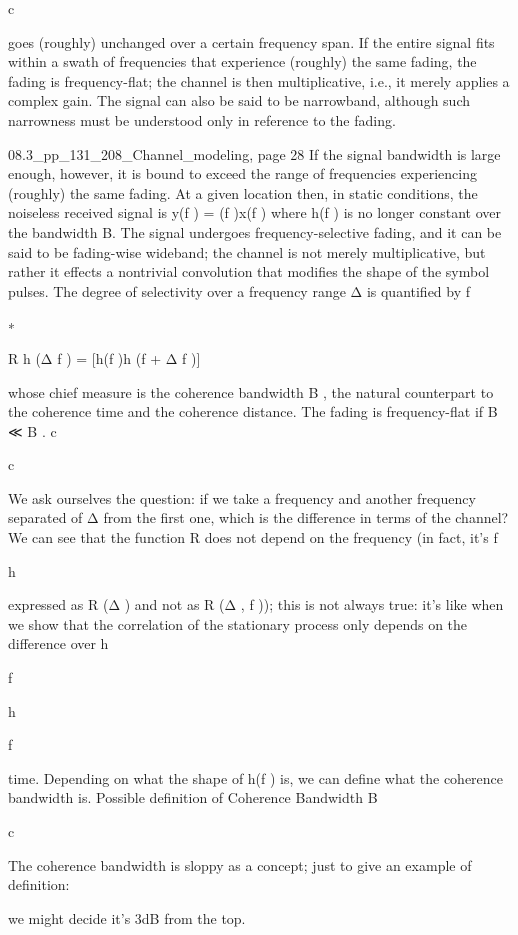 {{{{c

goes (roughly) unchanged over a certain frequency span. If the entire signal fits within a swath of frequencies that experience (roughly) the same fading, the fading is frequency-flat; the channel is then multiplicative, i.e., it merely applies a complex gain. The signal can also be said to be narrowband, although such narrowness must be understood only in reference to the fading.

08.3_pp_131_208_Channel_modeling, page 28 If the signal bandwidth is large enough, however, it is bound to exceed the range of frequencies experiencing (roughly) the same fading. At a given location then, in static conditions, the noiseless received signal is y(f ) = \sqrtGh(f )x(f ) where h(f ) is no longer constant over the bandwidth B. The signal undergoes frequency-selective fading, and it can be said to be fading-wise wideband; the channel is not merely multiplicative, but rather it effects a nontrivial convolution that modifies the shape of the symbol pulses. The degree of selectivity over a frequency range Δ is quantified by f

∗

R h (Δ f ) = [h(f )h (f + Δ f )]

whose chief measure is the coherence bandwidth B , the natural counterpart to the coherence time and the coherence distance. The fading is frequency-flat if B ≪ B .
c

c

We ask ourselves the question: if we take a frequency and another frequency separated of Δ from the first one, which is the difference in terms of the channel?
We can see that the function R does not depend on the frequency (in fact, it's f

h

expressed as R (Δ ) and not as R (Δ , f )); this is not always true: it's like when we show that the correlation of the stationary process only depends on the difference over h

f

h

f

time.
Depending on what the shape of h(f ) is, we can define what the coherence bandwidth is.
Possible definition of Coherence Bandwidth B

c

The coherence bandwidth is sloppy as a concept; just to give an example of definition:

we might decide it's 3dB from the top.

}}}}
